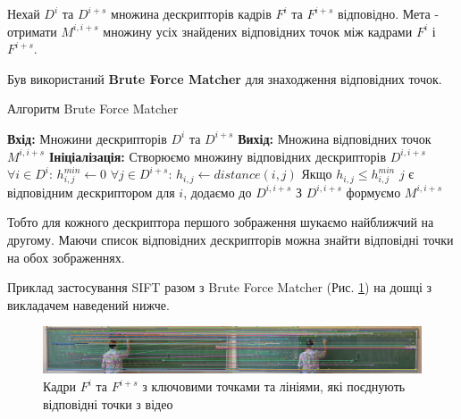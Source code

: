 Нехай $D^i$ та $D^{i+s}$ множина дескрипторів кадрів \(F^{i}\) та \(F^{i + s}\)
відповідно. Мета - отримати \(M^{i,i+s}\) множину усіх знайдених відповідних точок  між кадрами
\(F^{i}\) і \(F^{i + s}\).


Був використаний \textbf{Brute Force Matcher} для знаходження відповідних точок.
\begin{algorithm}[H]
    \caption{Алгоритм Brute Force Matcher}
    \begin{algorithmic}
        \State \textbf{Вхід:} Множини дескрипторів $D^i$ та $D^{i+s}$
        \State \textbf{Вихід:} Множина відповідних точок \(M^{i,i+s}\)
        \State \textbf{Ініціалізація:} Створюємо множину відповідних дескрипторів $D^{i,i+s}$
        \State $\forall i \in D^i$:
        \State  \qquad $h^{min}_{i,j} \gets 0$
        \State  \qquad  $\forall j \in D^{i+s}$:
        \State  \qquad \qquad  $h_{i,j} \gets distance(i,j)$
        \State  \qquad \qquad  Якщо {$h_{i,j} \leq h^{min}_{i,j}$}
        \State  \qquad \qquad  \qquad $j$ є відповідним  дескриптором для $i$, додаємо до  $D^{i,i+s}$
        \State З $D^{i,i+s}$ формуємо \(M^{i,i+s}\)
    \end{algorithmic}
    \label{al:brute-force-matcher}
\end{algorithm}

Тобто для кожного дескриптора першого зображення шукаємо найближчий на другому.
Маючи список відповідних дескрипторів можна знайти відповідні точки на обох зображеннях.

Приклад застосування SIFT разом з Brute Force Matcher (Рис. \ref{fig:matches_img}) на 
дошці з викладачем наведений нижче.

\begin{figure}[H]
    \centering
    \includegraphics[width=1\textwidth]{images/matches_img}
    \caption{Кадри $F^i$ та $F^{i+s}$ з ключовими точками та лініями, 
    які поєднують відповідні точки з відео \cite{yakovlev_video}
    \label{fig:matches_img}
    }
\end{figure}
